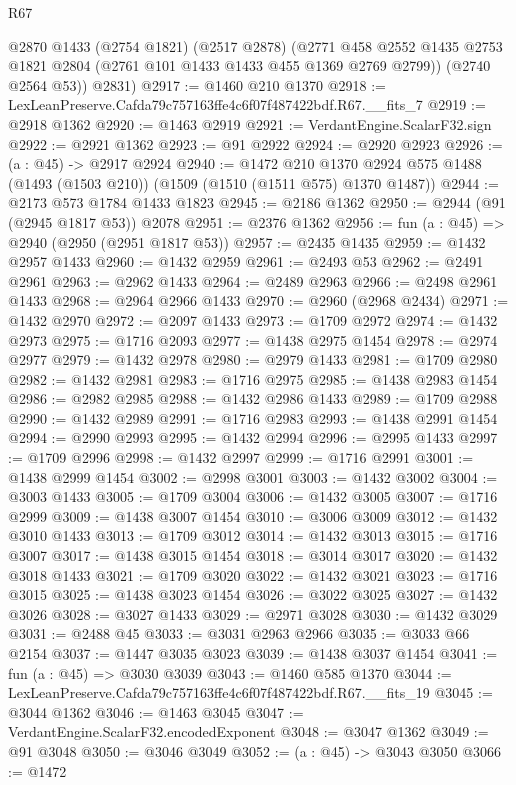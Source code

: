 \begin{lexlean}{R67}
\begin{coremodule}
        @2870
        @1433
        (@2754 @1821)
        (@2517 @2878)
        (@2771 @458 @2552 @1435 @2753 @1821 @2804 (@2761 @101 @1433 @1433 @455 @1369 @2769 @2799))
        (@2740 @2564 @53))
      @2831)
@2917 := @1460 @210 @1370
@2918 := LexLeanPreserve.Cafda79c757163ffe4c6f07f487422bdf.R67.__fits_7
@2919 := @2918 @1362
@2920 := @1463 @2919
@2921 := VerdantEngine.ScalarF32.sign
@2922 := @2921 @1362
@2923 := @91 @2922
@2924 := @2920 @2923
@2926 := (a : @45) -> @2917 @2924
@2940 := @1472
    @210
    @1370
    @2924
    @575
    @1488
    (@1493 (@1503 @210))
    (@1509 (@1510 (@1511 @575) @1370 @1487))
@2944 := @2173 @573 @1784 @1433 @1823
@2945 := @2186 @1362
@2950 := @2944 (@91 (@2945 @1817 @53)) @2078
@2951 := @2376 @1362
@2956 := fun (a : @45) => @2940 (@2950 (@2951 @1817 @53))
@2957 := @2435 @1435
@2959 := @1432 @2957 @1433
@2960 := @1432 @2959
@2961 := @2493 @53
@2962 := @2491 @2961
@2963 := @2962 @1433
@2964 := @2489 @2963
@2966 := @2498 @2961 @1433
@2968 := @2964 @2966 @1433
@2970 := @2960 (@2968 @2434)
@2971 := @1432 @2970
@2972 := @2097 @1433
@2973 := @1709 @2972
@2974 := @1432 @2973
@2975 := @1716 @2093
@2977 := @1438 @2975 @1454
@2978 := @2974 @2977
@2979 := @1432 @2978
@2980 := @2979 @1433
@2981 := @1709 @2980
@2982 := @1432 @2981
@2983 := @1716 @2975
@2985 := @1438 @2983 @1454
@2986 := @2982 @2985
@2988 := @1432 @2986 @1433
@2989 := @1709 @2988
@2990 := @1432 @2989
@2991 := @1716 @2983
@2993 := @1438 @2991 @1454
@2994 := @2990 @2993
@2995 := @1432 @2994
@2996 := @2995 @1433
@2997 := @1709 @2996
@2998 := @1432 @2997
@2999 := @1716 @2991
@3001 := @1438 @2999 @1454
@3002 := @2998 @3001
@3003 := @1432 @3002
@3004 := @3003 @1433
@3005 := @1709 @3004
@3006 := @1432 @3005
@3007 := @1716 @2999
@3009 := @1438 @3007 @1454
@3010 := @3006 @3009
@3012 := @1432 @3010 @1433
@3013 := @1709 @3012
@3014 := @1432 @3013
@3015 := @1716 @3007
@3017 := @1438 @3015 @1454
@3018 := @3014 @3017
@3020 := @1432 @3018 @1433
@3021 := @1709 @3020
@3022 := @1432 @3021
@3023 := @1716 @3015
@3025 := @1438 @3023 @1454
@3026 := @3022 @3025
@3027 := @1432 @3026
@3028 := @3027 @1433
@3029 := @2971 @3028
@3030 := @1432 @3029
@3031 := @2488 @45
@3033 := @3031 @2963 @2966
@3035 := @3033 @66 @2154
@3037 := @1447 @3035 @3023
@3039 := @1438 @3037 @1454
@3041 := fun (a : @45) => @3030 @3039
@3043 := @1460 @585 @1370
@3044 := LexLeanPreserve.Cafda79c757163ffe4c6f07f487422bdf.R67.__fits_19
@3045 := @3044 @1362
@3046 := @1463 @3045
@3047 := VerdantEngine.ScalarF32.encodedExponent
@3048 := @3047 @1362
@3049 := @91 @3048
@3050 := @3046 @3049
@3052 := (a : @45) -> @3043 @3050
@3066 := @1472

\end{coremodule}
\end{lexlean}
